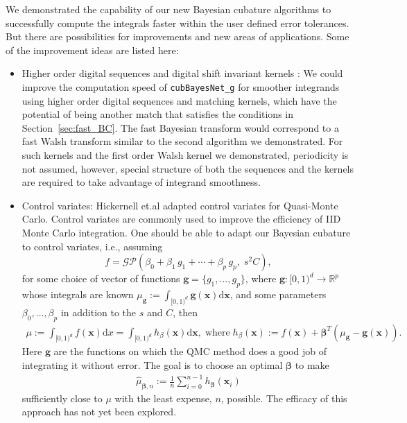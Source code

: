 \documentclass{iitthesis}          %
\newcommand{\bm}[1]{\boldsymbol{#1}}
\newcommand{\dif}[1]{\text{d}{#1}}
\newcommand{\reals}{\mathbb{R}}
\newcommand{\vbeta}{{\bm{\beta}}}
\newcommand{\vg}{\bm{g}}
\newcommand{\vx}{\bm{x}}
\newcommand{\dx}{\dif{{x}}}
\newcommand{\dvx}{\dif{\bm{x}}}
\newcommand{\code}[1]{\texttt{#1}}
\begin{document}
{{{{{{

We demonstrated the capability of our new Bayesian cubature algorithms to successfully compute the integrals faster within the user defined error tolerances. But there are possibilities for improvements and new areas of applications.
Some of the improvement ideas are listed here:
\begin{itemize}
\item Higher order digital sequences and digital shift invariant kernels \cite{Nuyens2013} \cite{Bald12a}:
We could improve the computation speed of \code{cubBayesNet\_g} for smoother integrands using higher order digital sequences and matching kernels, which have the potential of being another match that satisfies the conditions in Section~\ref{sec:fast_BC}.  The fast Bayesian transform would correspond to a fast Walsh transform similar to the second algorithm we demonstrated.  For such kernels and the first order Walsh kernel we demonstrated, periodicity is not assumed, however, special structure of both the sequences and the kernels are required to take advantage of integrand smoothness.

\item Control variates:
Hickernell et.al \cite{HicEtal17a} \cite{Li16a} adapted control variates for Quasi-Monte Carlo. 
Control variates are commonly used to improve the efficiency of IID Monte Carlo integration.
One should be able to adapt our Bayesian cubature to control variates, i.e., assuming  
\begin{equation*}
f = \mathcal{GP} \left( \beta_0 + \beta_1 \, g_1 + \cdots + \beta_p \, g_p, \;s^2 C \right),
\end{equation*}
for some choice of vector of functions $\vg = \{g_1, \ldots, g_p\}$, where $\vg : [0,1)^d \to \reals^p$ whose integrals are known $\mu_{\vg} := \int_{[0,1)^d} \vg(\vx)\dvx$, and some parameters $\beta_0, \ldots, \beta_p$ in addition to the $s$ and $C$, then
\begin{align*}
\mu :=
\int_{[0,1)^d} f(\vx) \dx =
\int_{[0,1)^d} h_{\beta} (\vx) \dvx,  \; \text{where} \;
h_{\beta}(\vx) := f(\vx) + \vbeta^T
(\mu_{\vg} - \vg(\vx)).
\end{align*}
Here $\vg$ are the functions on which the QMC method does a good job of integrating it without error. 
The goal is to choose an optimal $\vbeta$ to make
\begin{align*}
\widehat{\mu}_{\vbeta,n} :=
\frac 1n \sum_{i=0}^{n-1} h_{\vbeta} (\vx_i)
\end{align*}
sufficiently close to $\mu$ with the least expense, $n$, possible.
The efficacy of this approach has not yet been explored.











\end{itemize}}}}}}}
\end{document}
